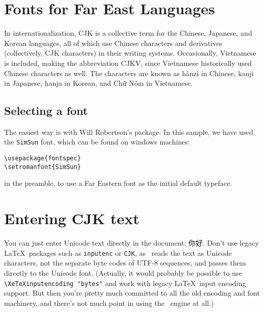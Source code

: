 \section{Fonts for Far East Languages}

In internationalization, CJK is a collective term for the Chinese, Japanese, and Korean languages, all of which use Chinese characters and derivatives (collectively, CJK characters) in their writing systems. Occasionally, Vietnamese is included, making the abbreviation CJKV, since Vietnamese historically used Chinese characters as well.
The characters are known as hànzì in Chinese, kanji in Japanese, hanja in Korean, and Chữ Nôm in Vietnamese.


\subsection{Selecting a font}

The easiest way is with Will Robertson's  package. In this sample, we have used the \texttt{SimSun} font, which can be found on windows machines:

\begin{verbatim}
\usepackage{fontspec}
\setromanfont{SimSun}
\end{verbatim}
in the preamble, to use a Far Eastern font as the initial default typeface.

\section{Entering CJK text}

You can just enter Unicode text directly in the document: 你好. Don't use legacy \LaTeX\ packages such as \verb|inputenc| or \verb|CJK|, as \XeTeX\ reads the text as Unicode characters, not the separate byte codes of UTF-8 sequences, and passes them directly to the Unicode font. (Actually, it would probably be possible to use \verb|\XeTeXinputencoding "bytes"| and work with legacy \LaTeX\ input encoding support. But then you're pretty much committed to all the old encoding and font machinery, and there's not much point in using the \XeTeX\ engine at all.)

